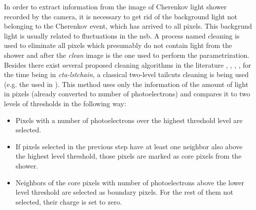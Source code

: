 \documentclass[main.tex]{subfiles}
\begin{document}
In order to extract information from the image of Cherenkov light shower recorded by the camera, it is necessary to get rid of the background light not belonging to the Cherenkov event, which has arrived to all pixels. This backgrund light is usually related to fluctuations in the \gls{nsb}. A process named cleaning is used to eliminate all pixels which presumably do not contain light from the shower and after the \textit{clean} image is the one used to perform the parametrization. Besides there exist several proposed cleaning algorithms in the literature \cite{2019cleaningCNN}, \cite{2013neighborcleaning}, \cite{2005Cleaningwithtimeinfo}, \cite{2001waveletcleaning}, for the time being in \textit{cta-lstchain}, a classical two-level tailcuts cleaning is being used (e.g. the used in \cite{1997HEGRAperformance}). This method uses only the information of the amount of light in pixels (already converted to number of photoelectrons) and compares it to two levels of thresholds in the following way:

\begin{itemize}

\item Pixels with a number of photoelectrons over the highest threshold level are selected.
\item If pixels selected in the previous step have at least one neighbor also above the highest level threshold, those pixels are marked as core pixels from the shower.

 \item Neighbors of the core pixels with number of photoelectrons above the lower level threshold are selected as boundary pixels. For the rest of them not selected, their charge is set to zero. 
\end{itemize}
   
\end{document}
